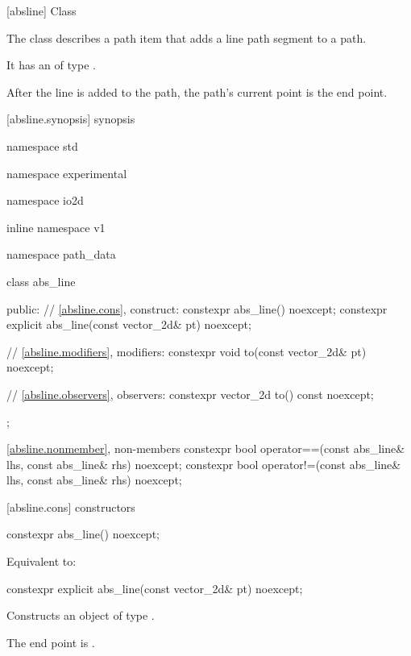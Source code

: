  [absline] {Class }%

\pnum
{}%
The class  describes a path item that adds a line path segment to a path.

\pnum
It has an  of type .

\pnum
After the line is added to the path, the path's current point is the end point.

 [absline.synopsis] { synopsis}%

\begin{codeblock}
namespace std { namespace experimental { namespace io2d { inline namespace v1 {
  namespace path_data {
    class abs_line {
    public:
      // \ref{absline.cons}, construct:
      constexpr abs_line() noexcept;
      constexpr explicit abs_line(const vector_2d& pt) noexcept;

      // \ref{absline.modifiers}, modifiers:
      constexpr void to(const vector_2d& pt) noexcept;

      // \ref{absline.observers}, observers:
      constexpr vector_2d to() const noexcept;
    };
    
    \ref{absline.nonmember}, non-members
    constexpr bool operator==(const abs_line& lhs, const abs_line& rhs) 
      noexcept;
    constexpr bool operator!=(const abs_line& lhs, const abs_line& rhs) 
      noexcept;
  }
} } } }
\end{codeblock}

 [absline.cons] { constructors}%

%
\begin{itemdecl}
constexpr abs_line() noexcept;
\end{itemdecl}
\begin{itemdescr}
\pnum
\effects
Equivalent to: 
\end{itemdescr}

%
\begin{itemdecl}
constexpr explicit abs_line(const vector_2d& pt) noexcept;
\end{itemdecl}
\begin{itemdescr}
\pnum
\effects
Constructs an object of type .

\pnum
The end point is .
\end{itemdescr}


